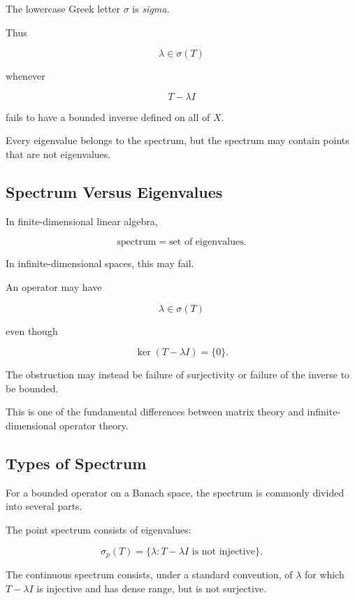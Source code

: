 The lowercase Greek letter \(\sigma\) is \emph{sigma}.

Thus

\[
\boxed{
\lambda\in\sigma(T)
}
\]

whenever

\[
T-\lambda I
\]

fails to have a bounded inverse defined on all of \(X\).

Every eigenvalue belongs to the spectrum, but the spectrum may contain
points that are not eigenvalues.

\subsection{Spectrum Versus Eigenvalues}
\label{subsec:spectrum-versus-eigenvalues}

In finite-dimensional linear algebra,

\[
\boxed{
\text{spectrum}
=
\text{set of eigenvalues}.
}
\]

In infinite-dimensional spaces, this may fail.

An operator may have

\[
\boxed{
\lambda\in\sigma(T)
}
\]

even though

\[
\boxed{
\ker(T-\lambda I)=\{0\}.
}
\]

The obstruction may instead be failure of surjectivity or failure of the
inverse to be bounded.

This is one of the fundamental differences between matrix theory and
infinite-dimensional operator theory.

\subsection{Types of Spectrum}
\label{subsec:types-of-spectrum}

For a bounded operator on a Banach space, the spectrum is commonly
divided into several parts.

The point spectrum consists of eigenvalues:

\[
\boxed{
\sigma_p(T)
=
\{
\lambda:
T-\lambda I
\text{ is not injective}
\}.
}
\]

The continuous spectrum consists, under a standard convention, of
\(\lambda\) for which \(T-\lambda I\) is injective and has dense range,
but is not surjective.

